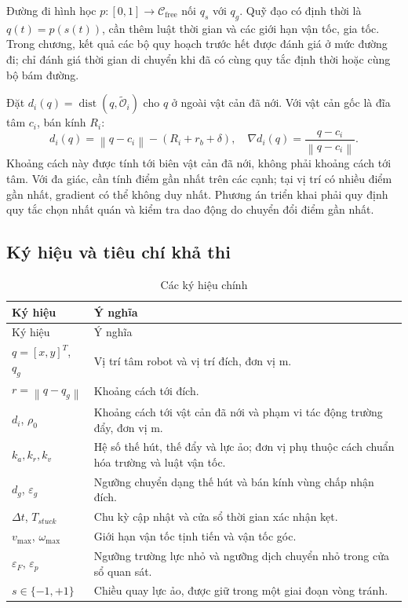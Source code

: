 \documentclass[12pt,a4paper,oneside]{report}
\numberwithin{equation}{chapter}
\newcommand{\norm}[1]{\left\lVert #1\right\rVert}
\begin{document}
Đường đi hình học $p:[0,1]\to\mathcal C_{\mathrm{free}}$ nối $q_s$ với $q_g$. Quỹ đạo có định thời là $q(t)=p(s(t))$, cần thêm luật thời gian và các giới hạn vận tốc, gia tốc. Trong chương, kết quả các bộ quy hoạch trước hết được đánh giá ở mức đường đi; chỉ đánh giá thời gian di chuyển khi đã có cùng quy tắc định thời hoặc cùng bộ bám đường.

Đặt $d_i(q)=\operatorname{dist}(q,\widetilde{\mathcal O}_i)$ cho $q$ ở ngoài vật cản đã nới. Với vật cản gốc là đĩa tâm $c_i$, bán kính $R_i$:
\begin{equation}
d_i(q)=\norm{q-c_i}-(R_i+r_b+\delta),\quad
\nabla d_i(q)=\frac{q-c_i}{\norm{q-c_i}}.
\label{eq:distance}
\end{equation}
Khoảng cách này được tính tới biên vật cản đã nới, không phải khoảng cách tới tâm. Với đa giác, cần tính điểm gần nhất trên các cạnh; tại vị trí có nhiều điểm gần nhất, gradient có thể không duy nhất. Phương án triển khai phải quy định quy tắc chọn nhất quán và kiểm tra dao động do chuyển đổi điểm gần nhất.

\subsection{Ký hiệu và tiêu chí khả thi}

\begin{longtable}{|>{\raggedright\arraybackslash}p{3cm}|>{\raggedright\arraybackslash}p{11.2cm}|}
\caption{Các ký hiệu chính}\label{tab:symbols}\\\hline
Ký hiệu & Ý nghĩa\\\hline
\endfirsthead
\hline Ký hiệu & Ý nghĩa\\\hline
\endhead
$q=[x,y]^T$, $q_g$ & Vị trí tâm robot và vị trí đích, đơn vị m.\\\hline
$r=\norm{q-q_g}$ & Khoảng cách tới đích.\\\hline
$d_i$, $\rho_0$ & Khoảng cách tới vật cản đã nới và phạm vi tác động trường đẩy, đơn vị m.\\\hline
$k_a,k_r,k_v$ & Hệ số thế hút, thế đẩy và lực ảo; đơn vị phụ thuộc cách chuẩn hóa trường và luật vận tốc.\\\hline
$d_g$, $\varepsilon_g$ & Ngưỡng chuyển dạng thế hút và bán kính vùng chấp nhận đích.\\\hline
$\Delta t$, $T_{stuck}$ & Chu kỳ cập nhật và cửa sổ thời gian xác nhận kẹt.\\\hline
$v_{\max}$, $\omega_{\max}$ & Giới hạn vận tốc tịnh tiến và vận tốc góc.\\\hline
$\varepsilon_F$, $\varepsilon_p$ & Ngưỡng trường lực nhỏ và ngưỡng dịch chuyển nhỏ trong cửa sổ quan sát.\\\hline
$s\in\{-1,+1\}$ & Chiều quay lực ảo, được giữ trong một giai đoạn vòng tránh.\\\hline
\end{longtable}
\end{document}
